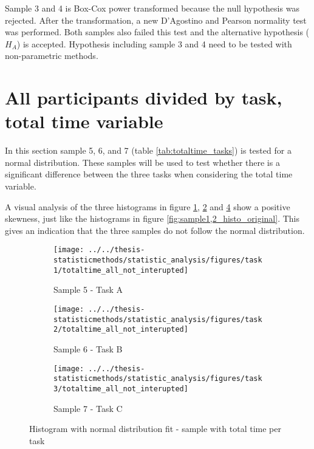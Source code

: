 \begin{appendices}
Sample 3 and 4 is Box-Cox power transformed because the null hypothesis was rejected. After the transformation, a new D'Agostino and Pearson normality test was performed. Both samples also failed this test and the alternative hypothesis ($H_A$) is accepted. Hypothesis including sample 3 and 4 need to be tested with non-parametric methods. 

\section{All participants divided by task, total time variable}\label{app:norm_5_6_7}

In this section sample 5, 6, and 7 (table \ref{tab:totaltime_tasks}) is tested for a normal distribution. These samples will be used to test whether there is a significant difference between the three tasks when considering the total time variable. 

A visual analysis of the three histograms in figure \ref{fig:totaltimeallnotinterupted_task1}, \ref{fig:totaltimeallnotinterupted_task2} and \ref{fig:totaltimeallnotinterupted_task3} show a positive skewness, just like the histograms in figure \ref{fig:sample1,2_histo_original}. This gives an indication that the three samples do not follow the normal distribution. 

\begin{figure}[H]
	\centering
	\begin{subfigure}[b]{0.32\textwidth}
		\centering
		\texttt{[image: ../../thesis-statisticmethods/statistic\_analysis/figures/task1/totaltime\_all\_not\_interupted]}
		\caption{Sample 5 - Task A}
		\label{fig:totaltimeallnotinterupted_task1}
	\end{subfigure}
	\begin{subfigure}[b]{0.32\textwidth}
		\centering
		\texttt{[image: ../../thesis-statisticmethods/statistic\_analysis/figures/task2/totaltime\_all\_not\_interupted]}
		\caption{Sample 6 - Task B}
		\label{fig:totaltimeallnotinterupted_task2}
	\end{subfigure}
	\begin{subfigure}[b]{0.32\textwidth}
		\centering
		\texttt{[image: ../../thesis-statisticmethods/statistic\_analysis/figures/task3/totaltime\_all\_not\_interupted]}
		\caption{Sample 7 - Task C}
		\label{fig:totaltimeallnotinterupted_task3}
	\end{subfigure}
	\caption{Histogram with normal distribution fit - sample with total time per task}
\end{figure}


\end{appendices}
